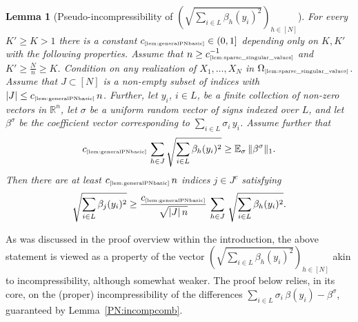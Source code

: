 \documentclass[11pt]{amsart}
\newtheorem{lemma}[theorem]{Lemma}
\theoremstyle{definition}
\theoremstyle{plain}
\newcommand{\R}{\mathbb{R}}
\def\R{{\mathbb R}}
\def\Exp{{\mathbb E}}
\begin{document}
\begin{lemma}[Pseudo-incompressibility of $(\sqrt{\sum_{i\in L}\beta_h(y_i)^2})_{h\in[N]}$]\label{lem:generalPNbasic}
For every $K'\geq K>1$
there is a constant $c_{\text{\tiny\ref{lem:generalPNbasic}}}\in(0,1]$
depending only on $K,K'$
with the following properties.
Assume that $n\geq c_{\text{\tiny\ref{lem:sparse_singular_values}}}^{-1}$
and $K'\geq \frac{N}{n}\geq K$.
Condition on any realization of $X_1,\dots,X_N$
in $\Omega_{\text{\tiny\ref{lem:sparse_singular_values}}}$.
Assume that $J\subset [N]$
is a non-empty subset of indices with
$|J|\leq c_{\text{\tiny\ref{lem:generalPNbasic}}}\,n$.
Further, let $y_i$, $i\in L$, be a finite collection of non-zero vectors
in $\R^n$, let $\sigma$ be a uniform random
vector of signs indexed over $L$, and 
let $\beta^\sigma$ be the coefficient vector
corresponding to $\sum_{i\in L}\sigma_i\,y_i$.
Assume further that
\begin{equation}\label{eq: 315aslkfnl}
c_{\text{\tiny\ref{lem:generalPNbasic}}}\,
\sum_{h\in J}\sqrt{\sum_{i\in L}\beta_h(y_i)^2}
\geq 
\Exp_{\sigma}\,\|\beta^\sigma\|_1.
\end{equation}
Then there are at least $c_{\text{\tiny\ref{lem:generalPNbasic}}}\,n$
indices $j\in J^c$ satisfying
$$
\sqrt{\sum_{i\in L}\beta_j(y_i)^2}
\geq 
\frac{c_{\text{\tiny\ref{lem:generalPNbasic}}}}{\sqrt{|J|\,n}}\,
\sum_{h\in J}
\,\sqrt{\sum_{i\in L}\beta_h(y_i)^2}.
$$
\end{lemma}
As was discussed in the proof overview within the introduction,
the above statement is viewed as a property of the vector $(\sqrt{\sum_{i\in L}\beta_h(y_i)^2})_{h\in[N]}$
akin to incompressibility, although somewhat weaker.
The proof below relies, in its core, on the (proper) incompressibility of
the differences $\sum_{i\in L}\sigma_i\,\beta(y_i)-\beta^\sigma$, guaranteed by Lemma~\ref{PN:incompcomb}.
\end{document}
